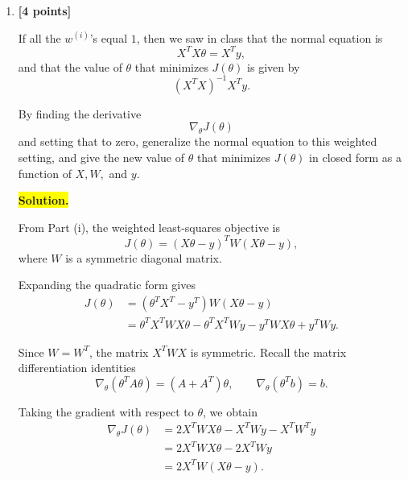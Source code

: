 \documentclass[10pt]{article}
\begin{document}
\begin{enumerate}
\begin{enumerate}[label=(\alph*)]
\begin{enumerate}[label=\roman*.]
Expanding the quadratic form, we obtain
\[
\begin{aligned}
(X\theta-y)^TW(X\theta-y)
&=
\frac12\sum_{i=1}^{m}
w^{(i)}
\left(\theta^Tx^{(i)}-y^{(i)}\right)^2\\
&=J(\theta).
\end{aligned}
\]

Therefore,
\[
\boxed{
J(\theta)=(X\theta-y)^TW(X\theta-y).
}
\]



\item \textbf{[4 points]}

If all the $w^{(i)}$'s equal $1$, then we saw in class that the normal
equation is
\[
X^TX\theta=X^Ty,
\]
and that the value of $\theta$ that minimizes $J(\theta)$ is given by
\[
(X^TX)^{-1}X^Ty.
\]

By finding the derivative
\[
\nabla_\theta J(\theta)
\]
and setting that to zero, generalize the normal equation to this
weighted setting, and give the new value of $\theta$ that minimizes
$J(\theta)$ in closed form as a function of $X,W,$ and $y$.


\medskip
\noindent\colorbox{yellow}{\textbf{Solution.}}
\vspace{3mm}

From Part (i), the weighted least-squares objective is
\[
J(\theta)=(X\theta-y)^TW(X\theta-y),
\]
where $W$ is a symmetric diagonal matrix.

Expanding the quadratic form gives
\[
\begin{aligned}
J(\theta)
&=(\theta^TX^T-y^T)W(X\theta-y)\\
&=\theta^TX^TWX\theta
-\theta^TX^TWy
-y^TWX\theta
+y^TWy.
\end{aligned}
\]

Since $W=W^T$, the matrix $X^TWX$ is symmetric.
Recall the matrix differentiation identities
\[
\nabla_\theta(\theta^TA\theta)
=(A+A^T)\theta,
\qquad
\nabla_\theta(\theta^Tb)=b.
\]

Taking the gradient with respect to $\theta$, we obtain
\[
\begin{aligned}
\nabla_\theta J(\theta)
&=2X^TWX\theta-X^TWy-X^TW^Ty\\
&=2X^TWX\theta-2X^TWy\\
&=2X^TW(X\theta-y).
\end{aligned}
\]


\end{enumerate}
\end{enumerate}
\end{enumerate}
\end{document}
